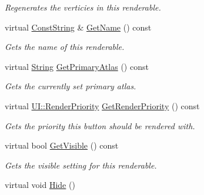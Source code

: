\begin{DoxyCompactItemize}
\begin{DoxyCompactList}\small\item\em Regenerates the verticies in this renderable. \item\end{DoxyCompactList}\item 
virtual \hyperlink{namespaceMezzanine_a63cd699ac54b73953f35ec9cfc05e506}{ConstString} \& \hyperlink{classMezzanine_1_1UI_1_1BasicRenderable_a1d3be8e827a562ade939383b4633ddb3}{GetName} () const 
\begin{DoxyCompactList}\small\item\em Gets the name of this renderable. \item\end{DoxyCompactList}\item 
virtual \hyperlink{namespaceMezzanine_acf9fcc130e6ebf08e3d8491aebcf1c86}{String} \hyperlink{classMezzanine_1_1UI_1_1BasicRenderable_a333701c21e49351bf905a27b96bac94d}{GetPrimaryAtlas} () const 
\begin{DoxyCompactList}\small\item\em Gets the currently set primary atlas. \item\end{DoxyCompactList}\item 
virtual \hyperlink{namespaceMezzanine_1_1UI_ac4c753eb6b5d66350a243acc9ce54130}{UI::RenderPriority} \hyperlink{classMezzanine_1_1UI_1_1BasicRenderable_a229905f629c59290e321014209d9457e}{GetRenderPriority} () const 
\begin{DoxyCompactList}\small\item\em Gets the priority this button should be rendered with. \item\end{DoxyCompactList}\item 
virtual bool \hyperlink{classMezzanine_1_1UI_1_1BasicRenderable_afee6e10e2fa607b309505d16ab7260d1}{GetVisible} () const 
\begin{DoxyCompactList}\small\item\em Gets the visible setting for this renderable. \item\end{DoxyCompactList}\item 
\hypertarget{classMezzanine_1_1UI_1_1BasicRenderable_acd8d40bacbb23eebacfdfcb42b33327d}{
virtual void \hyperlink{classMezzanine_1_1UI_1_1BasicRenderable_acd8d40bacbb23eebacfdfcb42b33327d}{Hide} ()}
\label{classMezzanine_1_1UI_1_1BasicRenderable_acd8d40bacbb23eebacfdfcb42b33327d}


\end{DoxyCompactItemize}
